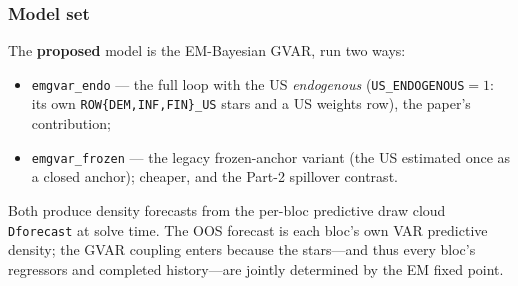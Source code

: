 \documentclass[11pt]{article}
\theoremstyle{definition}
\theoremstyle{remark}
\begin{document}
\subsubsection{Model set}\label{sec:empirical:modelset}

The \textbf{proposed} model is the EM-Bayesian GVAR, run two ways:
\begin{itemize}
  \item \texttt{emgvar\_endo} --- the full loop with the US
    \emph{endogenous} (\texttt{US\_ENDOGENOUS}$=1$: its own
    \texttt{ROW\{DEM,INF,FIN\}\_US} stars and a US weights row), the
    paper's contribution;
  \item \texttt{emgvar\_frozen} --- the legacy frozen-anchor variant
    (the US estimated once as a closed anchor); cheaper, and the Part-2
    spillover contrast.
\end{itemize}
Both produce density forecasts from the per-bloc predictive draw cloud
\texttt{Dforecast} at solve time. The OOS forecast is each bloc's own VAR
predictive density; the GVAR coupling enters because the stars---and thus
every bloc's regressors and completed history---are jointly determined by
the EM fixed point.
\end{document}
